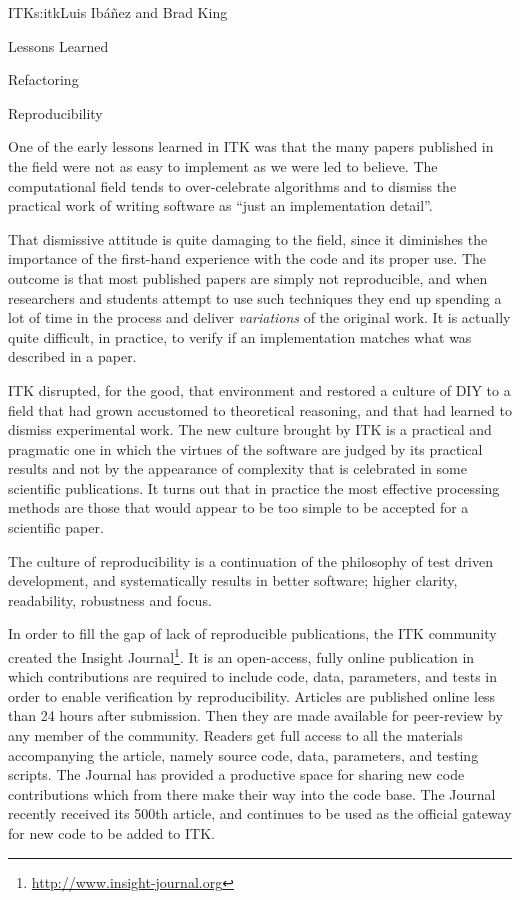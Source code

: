 \begin{aosachapter}{ITK}{s:itk}{Luis Ib\'{a}\~{n}ez and Brad King}
\begin{aosasect1}{Lessons Learned}
\begin{aosasect2}{Refactoring}
\end{aosasect2}

\begin{aosasect2}{Reproducibility}

One of the early lessons learned in ITK was that the many papers published in
the field were not as easy to implement as we were led to believe.  The
computational field tends to over-celebrate algorithms and to dismiss the
practical work of writing software as ``just an implementation detail''.

That dismissive attitude is quite damaging to the field, since it diminishes the
importance of the first-hand experience with the code and its proper use. The
outcome is that most published papers are simply not reproducible, and 
when researchers and students attempt to use such techniques they end up
spending a lot of time in the process and deliver \emph{variations} of the
original work. It is actually quite difficult, in practice, to verify if an
implementation matches what was described in a paper.

ITK disrupted, for the good, that environment and restored a culture of DIY
to a field that had grown accustomed to theoretical
reasoning, and that had learned to dismiss experimental work. The new culture
brought by ITK is a practical and pragmatic one in which the virtues of the
software are judged by its practical results and not by the appearance of
complexity that is celebrated in some scientific publications. It turns
out that in practice the most effective processing methods are those that
would appear to be too simple to be accepted for a scientific paper.

The culture of reproducibility is a continuation of the philosophy of test
driven development, and systematically results in better software; higher
clarity, readability, robustness and focus.

In order to fill the gap of lack of reproducible publications, the ITK community
created the Insight Journal\footnote{\url{http://www.insight-journal.org}}.
It is an open-access, fully online publication in which contributions are
required to include code, data, parameters, and tests in order to enable
verification by reproducibility. Articles are published online less than 24
hours after submission. Then they are made available for peer-review by any
member of the community. Readers get full access to all the materials
accompanying the article, namely source code, data, parameters, and testing
scripts. The Journal has provided a productive space for sharing new code
contributions which from there make their way into the code base. The Journal
recently received its 500th article, and continues to be used as the official
gateway for new code to be added to ITK.
\end{aosasect2}

\end{aosasect1}

\end{aosachapter}

